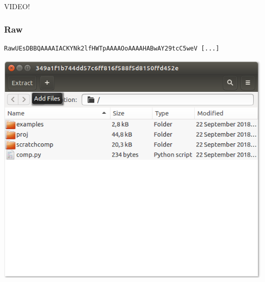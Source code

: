 \begin{frame}
    \centering
    \begin{LARGE}
        VIDEO!
    \end{LARGE}
\end{frame}


\begin{frame}[fragile]
\frametitle{Raw}
\begin{lstlisting}
RawUEsDBBQAAAAIACKYNk2lfHWTpAAAAOoAAAAHABwAY29tcC5weV [...]
\end{lstlisting}
\end{frame}

\begin{frame}
    \centering
    \includegraphics[width=0.7\linewidth]{pics/zip1.png}
\end{frame}
